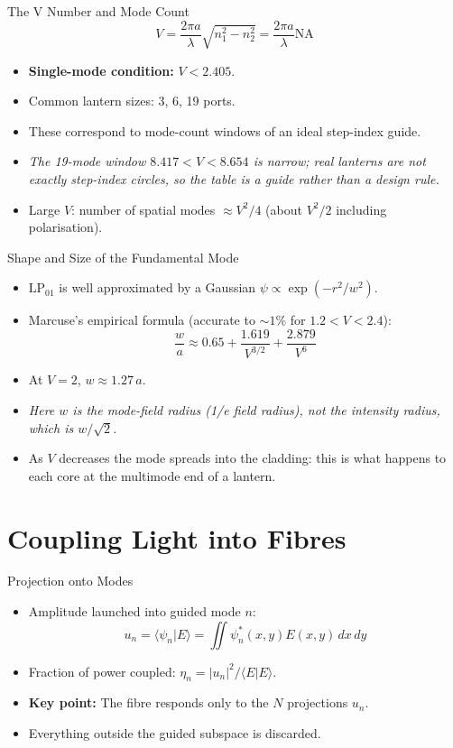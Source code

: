 \documentclass[aspectratio=169,10pt]{beamer}
\begin{document}
\begin{frame}{The V Number and Mode Count}
\[
    V = \frac{2\pi a}{\lambda} \sqrt{n_1^2 - n_2^2} = \frac{2\pi a}{\lambda} \mathrm{NA}
\]
\begin{itemize}
    \item \textbf{Single-mode condition:} \(V < 2.405\).
    \item Common lantern sizes: 3, 6, 19 ports.
    \item These correspond to mode-count windows of an ideal step-index guide.
    \item \emph{The 19-mode window \(8.417 < V < 8.654\) is narrow; real lanterns are not exactly step-index circles, so the table is a guide rather than a design rule.}
    \item Large \(V\): number of spatial modes \(\approx V^2/4\) (about \(V^2/2\) including polarisation).
\end{itemize}
\end{frame}

\begin{frame}{Shape and Size of the Fundamental Mode}
\begin{itemize}
    \item \(\mathrm{LP}_{01}\) is well approximated by a Gaussian \(\psi \propto \exp(-r^2/w^2)\).
    \item Marcuse's empirical formula (accurate to $\sim 1\%$ for \(1.2 < V < 2.4\)):
    \[
        \frac{w}{a} \approx 0.65 + \frac{1.619}{V^{3/2}} + \frac{2.879}{V^6}
    \]
    \item At \(V = 2\), \(w \approx 1.27\,a\).
    \item \emph{Here $w$ is the mode-field radius (1/e field radius), not the intensity radius, which is $w/\sqrt{2}$.}
    \item As \(V\) decreases the mode spreads into the cladding: this is what happens to each core at the multimode end of a lantern.
\end{itemize}
\end{frame}

\section{Coupling Light into Fibres}
\begin{frame}{Projection onto Modes}
\begin{itemize}
    \item Amplitude launched into guided mode \(n\):
    \[
        u_n = \langle \psi_n | E \rangle = \iint \psi_n^*(x,y) E(x,y) \, dx\, dy
    \]
    \item Fraction of power coupled: \(\eta_n = |u_n|^2 / \langle E|E\rangle\).
    \item \textbf{Key point:} The fibre responds only to the \(N\) projections \(u_n\).
    \item Everything outside the guided subspace is discarded.
\end{itemize}
\end{frame}
\end{document}
